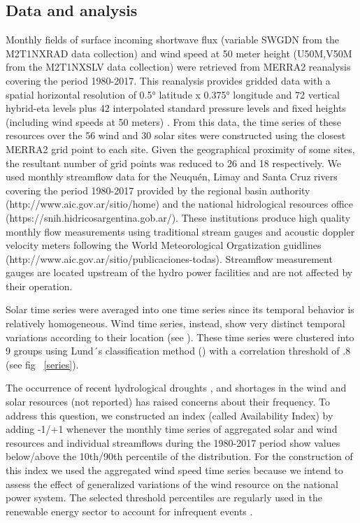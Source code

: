 \documentclass[AMA,Times1COL]{WileyNJDv5} %
\begin{document}
\begin{linenumbers}
\subsection{Data and analysis}

Monthly fields of surface incoming shortwave flux (variable SWGDN from the M2T1NXRAD data collection) and wind speed at 50 meter height (U50M,V50M from the M2T1NXSLV data collection) were retrieved from MERRA2 reanalysis \cite{} covering the period 1980-2017. This reanalysis provides gridded data with a spatial horizontal resolution of 0.5° latitude x 0.375° longitude and 72 vertical hybrid-eta levels plus 42 interpolated standard pressure levels and fixed heights (including wind speeds at 50 meters) \cite{bosilovich2015merra, gelaro2017modern}. From this data, the time series of these resources over the 56 wind and 30 solar sites were constructed using the closest MERRA2 grid point to each site. Given the geographical proximity of some sites, the resultant number of grid points was reduced to 26 and 18 respectively. We used monthly streamflow data for the Neuquén, Limay and Santa Cruz rivers covering the period 1980-2017 provided by the regional basin authority (http://www.aic.gov.ar/sitio/home) and the national hidrological resources office (https://snih.hidricosargentina.gob.ar/). These institutions produce high quality monthly flow measurements using traditional stream gauges and acoustic doppler velocity meters following the World Meteorological Orgatization guidlines (http://www.aic.gov.ar/sitio/publicaciones-todas). Streamflow measurement gauges are located upstream of the hydro power facilities and are not affected by their operation.

Solar time series were averaged into one time series since its temporal behavior is relatively homogeneous. Wind time series, instead, show very distinct temporal variations according to their location (see \cite{bianchi2019spatiotemporal}). These time series were clustered into 9 groups using Lund´s classification method (\cite{lund1963map}) with a correlation threshold of .8 (see fig ~\ref{series}).

The occurrence of recent hydrological droughts \cite{aguayo2021hydrological}, and shortages in the wind and solar resources (not reported) has raised concerns about their frequency. To address this question, we constructed an index (called Availability Index) by adding -1/+1 whenever the monthly time series of aggregated solar and wind resources and individual streamflows during the 1980-2017 period show values below/above the 10th/90th percentile of the distribution. For the construction of this index we used the aggregated wind speed time series because we intend to assess the effect of generalized variations of the wind resource on  the national power system. The selected threshold percentiles are regularly used in the renewable energy sector to account for infrequent events \cite{dobos2012p50, pryor2018interannual, aytac2024environmental}.


\end{linenumbers}
\end{document}
